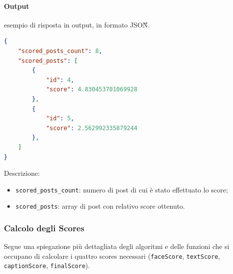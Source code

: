 \paragraph*{Output} esempio di risposta in output, in formato JSON\G{}.
\begin{lstlisting}[language=JSON]
{
    "scored_posts_count": 8,
    "scored_posts": [
        {
            "id": 4,
            "score": 4.830453701069928
        },
        {
            "id": 5,
            "score": 2.562992335879244
        },
    ]
}
\end{lstlisting}
Descrizione:
\begin{itemize}
    \item \verb|scored_posts_count|: numero di post di cui è stato effettuato lo score;
    \item \verb|scored_posts|: array di post con relativo score ottenuto. 
\end{itemize}

\subsubsection{Calcolo degli Scores}
Segue una spiegazione più dettagliata degli algoritmi e delle funzioni che si occupano di calcolare
i quattro scores necessari (\verb+faceScore+, \verb+textScore+, \verb+captionScore+, \verb+finalScore+).

